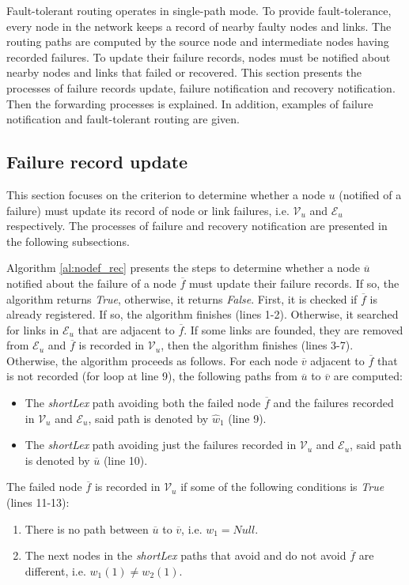 \label{sec:fault_tolerant}

Fault-tolerant routing operates in single-path mode. To provide fault-tolerance, every node in the network keeps a record of nearby faulty nodes and links. The routing  paths  are computed by the source node and intermediate nodes having recorded failures. To update their failure records, nodes must be notified about nearby nodes and links that failed or recovered.
This section presents the processes of failure records update, failure notification and recovery notification. Then  the forwarding  processes is explained. In addition, examples of failure notification and fault-tolerant routing are given.

\subsection{Failure record update}

This section focuses on the criterion to determine whether a
node $u$ (notified of a failure) must update its record of node or link failures, i.e. $\mathcal{V}_u$ and $\mathcal{E}_u$ respectively. The processes of failure and recovery notification are presented in the following subsections.

 

Algorithm \ref{al:nodef_rec} presents the steps to determine whether a node $\overline{u}$ notified about the failure of a node $\overline{f}$ must update their failure records. If so, the algorithm returns \textit{True}, otherwise, it returns \textit{False}. First, it is checked if $\overline{f}$ is already registered. If so, the algorithm finishes (lines 1-2). Otherwise, it searched for links in $\mathcal{E}_u$ that are
adjacent to $\overline{f}$. If some links are founded, they are removed from $\mathcal{E}_u$ and $\overline{f}$ is recorded in $\mathcal{V}_u$, then the algorithm finishes (lines 3-7). Otherwise, the algorithm proceeds as follows. For each  node $\overline{v}$ adjacent to $\overline{f}$ that is not recorded (for loop at line 9), the following paths from $\overline{u}$ to $\overline{v}$ are computed:
\begin{itemize}
    \item The \textit{shortLex} path avoiding both the failed node $\overline{f}$ and the failures recorded in $\mathcal{V}_u$ and $\mathcal{E}_u$,
    said path is denoted by $\widehat{w}_1$ (line 9). 
\item The \textit{shortLex} path avoiding just the failures recorded in $\mathcal{V}_u$ and $\mathcal{E}_u$, said path is denoted by $\overline{u}$ (line 10). 
\end{itemize}
The failed node $\overline{f}$ is recorded in $\mathcal{V}_u$ if some of the following conditions is \textit{True} (lines 11-13):
\begin{enumerate}
    \item There is no path between $\overline{u}$ to $\overline{v}$, i.e. $w_1=\textit{Null}$.
    \item The next nodes in the \textit{shortLex} paths that avoid and do not avoid $\overline{f}$ are different, i.e. $w_1(1)\neq w_2(1)$.
\end{enumerate}

